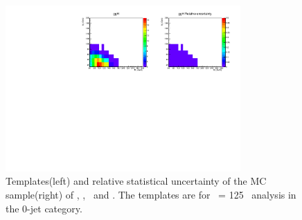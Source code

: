 \begin{figure}[htp]
\includegraphics[width=0.8\textwidth]{figures/2dtemplate_ggH_mH125_0j.pdf}
\caption{Templates(left) and relative statistical uncertainty of the MC sample(right) 
of \qqWH, \qqZH, \qqH\ and \ggH. 
The templates are for \mHi\ = 125 \GeV\ analysis in the 0-jet category.
}
\label{fig:2dtemplate_125_0j_1}
\end{figure}


